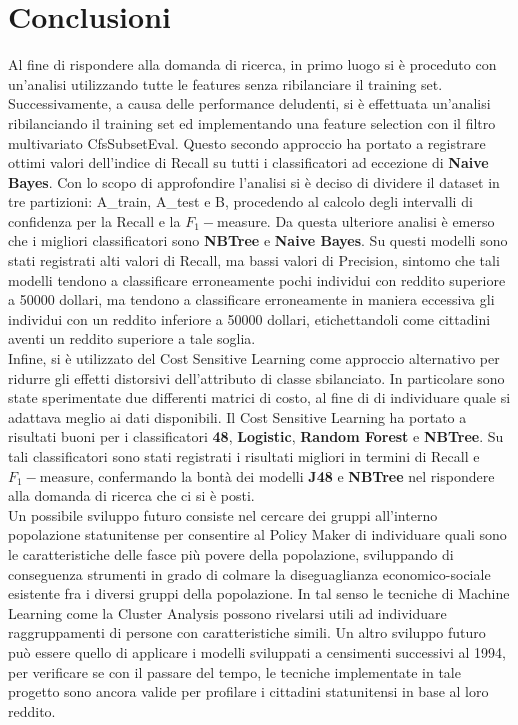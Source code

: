 \documentclass[fleqn,10pt]{SelfArx}
\begin{document}
\section*{Conclusioni}
Al fine di rispondere alla domanda di ricerca, in primo luogo si è proceduto con un'analisi utilizzando tutte le features senza ribilanciare il training set. Successivamente, a causa delle performance deludenti, si è effettuata un'analisi ribilanciando il training set ed implementando una feature selection con il filtro multivariato CfsSubsetEval. Questo secondo approccio ha portato a registrare ottimi valori dell'indice di Recall su tutti i classificatori ad eccezione di \textbf{Naive Bayes}. Con lo scopo di approfondire l'analisi si è deciso di dividere il dataset in tre partizioni: A\_train, A\_test e B, procedendo al calcolo degli intervalli di confidenza per la Recall e la $F_1-$measure. Da questa ulteriore analisi è emerso che i migliori classificatori sono \textbf{NBTree} e \textbf{Naive Bayes}. Su questi modelli sono stati registrati alti valori di Recall, ma bassi valori di Precision, sintomo che tali modelli tendono a classificare erroneamente pochi individui con reddito superiore a \num{50000} dollari, ma tendono a classificare erroneamente in maniera eccessiva gli individui con un reddito inferiore a \num{50000} dollari, etichettandoli come cittadini aventi un reddito superiore a tale soglia. \\
Infine, si è utilizzato del Cost Sensitive Learning come approccio alternativo per ridurre gli effetti distorsivi dell'attributo di classe sbilanciato. In particolare sono state sperimentate due differenti matrici di costo, al fine di di individuare quale si adattava meglio ai dati disponibili. Il Cost Sensitive Learning ha portato a risultati buoni per i classificatori \textbf{48}, \textbf{Logistic}, \textbf{Random Forest} e \textbf{NBTree}. Su tali classificatori sono stati registrati i risultati migliori in termini di Recall e $F_1-$measure, confermando la bontà dei modelli \textbf{J48} e \textbf{NBTree} nel rispondere alla domanda di ricerca che ci si è posti.\\
Un possibile sviluppo futuro consiste nel cercare dei gruppi all'interno popolazione statunitense per consentire al Policy Maker di individuare quali sono le caratteristiche delle fasce più povere della popolazione, sviluppando di conseguenza strumenti in grado di colmare la diseguaglianza economico-sociale esistente fra i diversi gruppi della popolazione. In tal senso le tecniche di Machine Learning come la Cluster Analysis possono rivelarsi utili ad individuare raggruppamenti di persone con caratteristiche simili. Un altro sviluppo futuro può essere quello di applicare i modelli sviluppati a censimenti successivi al 1994, per verificare se con il passare del tempo, le tecniche implementate in tale progetto sono ancora valide per profilare i cittadini statunitensi in base al loro reddito.
\end{document}
